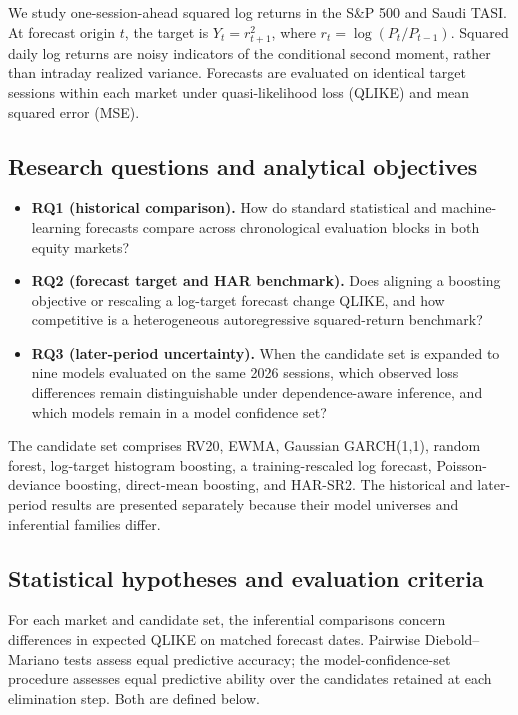 We study one-session-ahead squared log returns in the S\&P 500 and Saudi TASI. At forecast origin $t$, the target is $Y_t=r_{t+1}^2$, where $r_t=\log(P_t/P_{t-1})$. Squared daily log returns are noisy indicators of the conditional second moment, rather than intraday realized variance. Forecasts are evaluated on identical target sessions within each market under quasi-likelihood loss (QLIKE) and mean squared error (MSE).

\subsection{Research questions and analytical objectives}
\begin{itemize}
\item \textbf{RQ1 (historical comparison).} How do standard statistical and machine-learning forecasts compare across chronological evaluation blocks in both equity markets?
\item \textbf{RQ2 (forecast target and HAR benchmark).} Does aligning a boosting objective or rescaling a log-target forecast change QLIKE, and how competitive is a heterogeneous autoregressive squared-return benchmark?
\item \textbf{RQ3 (later-period uncertainty).} When the candidate set is expanded to nine models evaluated on the same 2026 sessions, which observed loss differences remain distinguishable under dependence-aware inference, and which models remain in a model confidence set?
\end{itemize}

The candidate set comprises RV20, EWMA, Gaussian GARCH(1,1), random forest, log-target histogram boosting, a training-rescaled log forecast, Poisson-deviance boosting, direct-mean boosting, and HAR-SR2. The historical and later-period results are presented separately because their model universes and inferential families differ.

\subsection{Statistical hypotheses and evaluation criteria}\label{sec:study2_hypotheses}
For each market and candidate set, the inferential comparisons concern differences in expected QLIKE on matched forecast dates. Pairwise Diebold--Mariano tests assess equal predictive accuracy; the model-confidence-set procedure assesses equal predictive ability over the candidates retained at each elimination step. Both are defined below.

